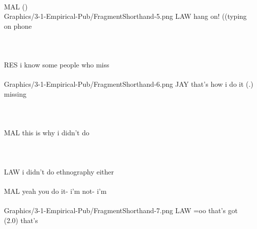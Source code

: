 \begin{inlinefrag*}
\begin{transcript*}
         \\
        \by MAL {(\qquad \qquad \qquad \qquad )} \\
           {Graphics/3-1-Empirical-Pub/FragmentShorthand-5.png}
        \by LAW {hang on! ((typing on phone} \\
         \\
         \\
         \\
        \by RES {i know some people who miss} \\
         \\
           {Graphics/3-1-Empirical-Pub/FragmentShorthand-6.png}
        \by JAY {that's how i do it (.) missing} \\
         \\
         \\
         \\
        \by MAL {this is why i didn't do} \\
         \\
         \\
         \\
        \by LAW {i didn't do ethnography either} \\
         \\
        \by MAL {yeah\intUp{} you do it- i'm not- i'm} \\
         \\
           {Graphics/3-1-Empirical-Pub/FragmentShorthand-7.png}
        \by LAW {=oo\intUp{} that's got (2.0) that's} \\
         \\
    \end{transcript*}
\end{inlinefrag*}

